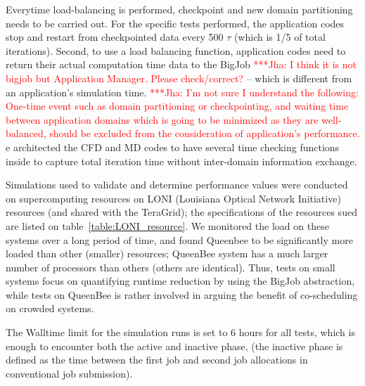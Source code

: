 \documentclass[conference,final]{IEEEtran}
\newcommand{\jhanote}[1]{ {\textcolor{red} { ***Jha: #1 }}}
\newcommand{\jhanote}[1]{}
\begin{document}


Everytime load-balancing is performed, checkpoint and new domain
partitioning needs to be carried out. For the specific tests
performed, the application codes stop and restart from checkpointed
data every 500 $\tau$ (which is 1/5 of total iterations). Second, to
use a load balancing function, application codes need to return their
actual computation time data to the BigJob \jhanote{I think it is not
  bigjob but Application Manager. Please check/correct?}  -- which is
different from an application's simulation time.  \jhanote{I'm not
  sure I understand the following: One-time event such as domain
  partitioning or checkpointing, and waiting time between application
  domains which is going to be minimized as they are well-balanced,
  should be excluded from the consideration of application's
  performance.}  e architected the CFD and MD codes to have several
time checking functions inside to capture total iteration time without
inter-domain information exchange.

Simulations used to validate and determine performance values were
conducted on supercomputing resources on LONI (Louisiana Optical
Network Initiative)~\cite{LONI_web} resources (and shared with the
TeraGrid); the specifications of the resources sued are listed on
table~\ref{table:LONI_resource}.  We monitored the load on these
systems over a long period of time, and found Queenbee to be
significantly more loaded than other (smaller) resources; QueenBee
system has a much larger number of processors than others (others are
identical). Thus, tests on small systems focus on quantifying runtime
reduction by using the BigJob abstraction, while tests on QueenBee is
rather involved in arguing the benefit of co-scheduling on crowded
systems.

The Walltime limit for the simulation runs is set to 6 hours for all
tests, which is enough to encounter both the active and inactive
phase, (the inactive phase is defined as the time between the first
job and second job allocations in conventional job submission).
\end{document}
